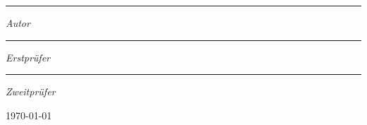 \begin{titlepage}
    \centering
    {\scshape\LARGE \uni{} \par \studiengang{} \par \modul{} \par}
    \vspace{1cm}
    {\scshape\Large \titel{} \par}
    \vspace{1.5cm}
    {\bfseries \huge \subtitel{} \par}
    \vspace{2cm}
    {\Large \vorname{} \nachname{} \par \matr{} \par}
    \vfill
    \begin{center}
        \uklogo
        \par
        \abteilung{}
    \end{center}

    \par\vfill
    \parbox{4cm}{\hrule \strut{} \centering \footnotesize \vorname{} \nachname{} \par \textit{Autor}}
    \hfill
    \parbox{5cm}{\hrule \strut{} \centering \footnotesize \erstpruefer{} \par \textit{Erstprüfer}}
    \hfill
    \parbox{4cm}{\hrule \strut{} \centering \footnotesize \zweitpruefer{} \par \textit{Zweitprüfer}}
    \vfill
    {\large \location{} \today \par}
\end{titlepage}